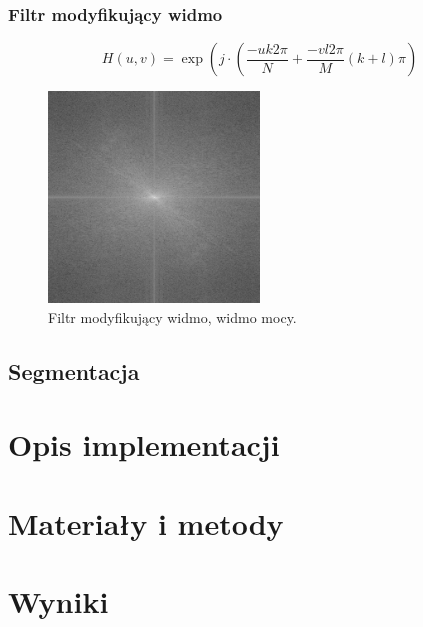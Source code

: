 \documentclass{classrep}
\begin{document}
\subsubsection{Filtr modyfikujący widmo}

\begin{equation}
\label{eq:modyfikacja}
H(u,v) = \exp { \left( j \cdot \left( \frac{-u k 2 \pi}{N} + \frac{-v l 2 \pi }{M} \left( k + l  \right) \pi \right) }
\end{equation}

\begin{figure}[H]
  \centering
  \includegraphics[width=0.5\textwidth]{img/lena_spectreMod}
  \caption{Filtr modyfikujący widmo, widmo mocy.}
  \label{fig_widmo_lena_spectreMod}
\end{figure}


\subsection{Segmentacja}





\section{Opis implementacji}



\section{Materiały i metody}





\section{Wyniki}
\end{document}
